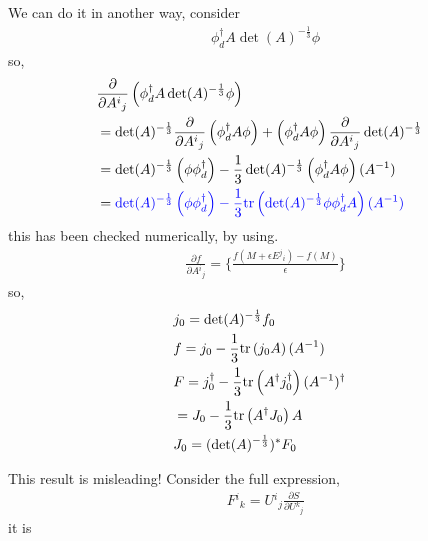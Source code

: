 \begin{tcolorbox}
We can do it in another way, consider
\begin{equation}
\begin{split}
&\phi _d^{\dagger}A \det(A)^{-\frac{1}{3}} \phi 
\end{split}
\end{equation}
so,
\begin{equation}
\begin{split}
&\frac{\partial}{\partial A{}^i{}_j} \left(\phi _d^{\dagger}A \det(A)^{-\frac{1}{3}} \phi \right)\\
&=\det(A)^{-\frac{1}{3}}\frac{\partial}{\partial A{}^i{}_j} \left(\phi _d^{\dagger}A  \phi \right)+\left(\phi _d^{\dagger}A \phi \right)  \frac{\partial}{\partial A{}^i{}_j} \det(A)^{-\frac{1}{3}}\\
&=\det(A)^{-\frac{1}{3}}\left(\phi \phi _d^{\dagger}\right)-\frac{1}{3}\det(A)^{-\frac{1}{3}} \left(\phi _d^{\dagger}A \phi \right)  (A^{-1})\\
&=\textcolor[rgb]{0,0,1}{\det(A)^{-\frac{1}{3}}\left(\phi \phi _d^{\dagger}\right)-\frac{1}{3} {\rm tr}\left(\det(A)^{-\frac{1}{3}}\phi \phi _d^{\dagger}A  \right)  (A^{-1})}\\
\end{split}
\end{equation}
this has been checked numerically, by using.
\begin{equation}
\begin{split}
&\frac{\partial f}{\partial A{}^i{}_j}=\{\frac{f(M+\epsilon E{}^j{}_i)-f(M)}{\epsilon}\}
\end{split}
\end{equation}
so,
\begin{equation}
\begin{split}
&j_0=\det(A)^{-\frac{1}{3}}f_0\\
&f=j_0-\frac{1}{3} {\rm tr}\left(j_0A  \right)  (A^{-1})\\
&F=j_0^{\dagger}-\frac{1}{3} {\rm tr}\left(A^{\dagger} j_0^{\dagger}  \right)  (A^{-1})^{\dagger}\\
&=J_0-\frac{1}{3} {\rm tr}\left(A^{\dagger} J_0  \right)  A\\
&J_0=(\det(A)^{-\frac{1}{3}})^*F_0\\
\end{split}
\end{equation}

This result is misleading!
Consider the full expression,
\begin{equation}
\begin{split}
&F{}^i{}_k=U{}^{i}{}_j\frac{\partial S}{\partial U{}^k{}_j}
\end{split}
\end{equation}
it is

\end{tcolorbox}

